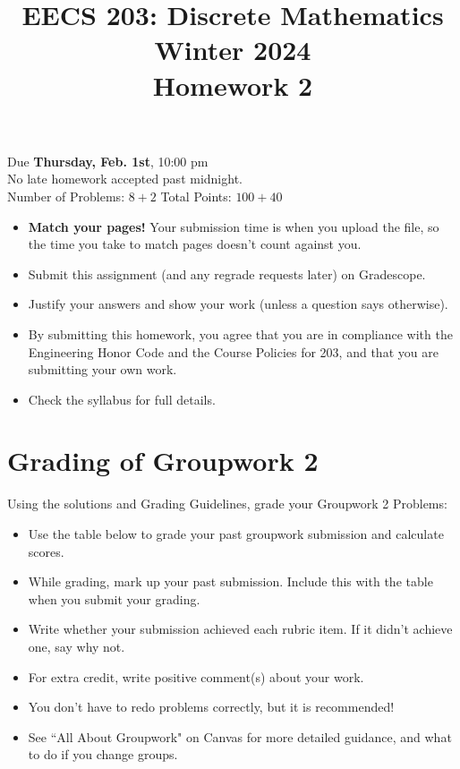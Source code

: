 \documentclass[12pt]{exam}
\newcommand{\hwnum}{2}
\begin{document}
\title{EECS 203: Discrete Mathematics\\
	Winter 2024\\
	Homework \hwnum{}}
\date{}
\author{}
\maketitle
\vspace{-50pt}
\begin{center}
	\huge Due \textbf{Thursday, Feb. 1st}, 10:00 pm\\
	\Large No late homework accepted past midnight.\\
	\vspace{10pt}
	\large Number of Problems: $8+2$
	\hspace{3cm}
	Total Points: $100+40$
\end{center}
\vspace{25pt}
\begin{itemize}
	\item \textbf{Match your pages!} Your submission time is when you upload the file, so the time you take to match pages doesn't count against you.
	\item Submit this assignment (and any regrade requests later) on Gradescope.
	\item Justify your answers and show your work (unless a question says otherwise).
	\item By submitting this homework, you agree that you are in compliance with the Engineering Honor Code and the Course Policies for 203, and that you are submitting your own work.
	\item Check the syllabus for full details.
\end{itemize}
\newpage
\pagebreak
\section*{Grading of Groupwork 2}
Using the solutions and Grading Guidelines, grade your Groupwork 2 Problems:
\begin{itemize}
    \item Use the table below to grade your past groupwork submission and calculate scores.
    \item While grading, mark up your past submission. Include this with the table when you submit your grading.
    \item Write whether your submission achieved each rubric item. If it didn't achieve one, say why not.
    \item For extra credit, write positive comment(s) about your work.
    \item You don't have to redo problems correctly, but it is recommended!
    \item See ``All About Groupwork" on Canvas for more detailed guidance, and what to do if you change groups.
\end{itemize}
\end{document}
